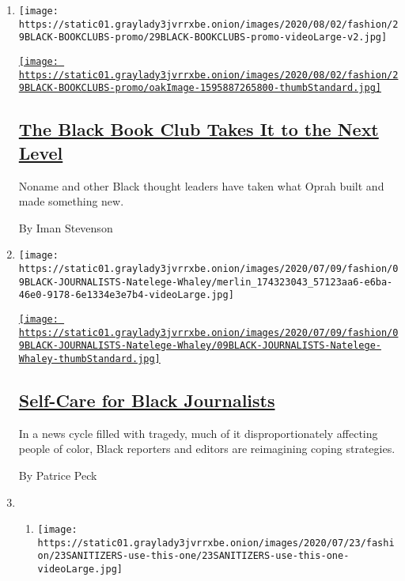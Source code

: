 \begin{enumerate}
\def\labelenumi{\arabic{enumi}.}
\item
  \texttt{[image: https://static01.graylady3jvrrxbe.onion/images/2020/08/02/fashion/29BLACK-BOOKCLUBS-promo/29BLACK-BOOKCLUBS-promo-videoLarge-v2.jpg]}

  \href{/2020/07/29/style/self-care/black-book-clubs.html}{\texttt{[image: https://static01.graylady3jvrrxbe.onion/images/2020/08/02/fashion/29BLACK-BOOKCLUBS-promo/oakImage-1595887265800-thumbStandard.jpg]}}

  \hypertarget{the-black-book-club-takes-it-to-the-next-level}{%
  \subsection{\texorpdfstring{\href{/2020/07/29/style/self-care/black-book-clubs.html}{The
  Black Book Club Takes It to the Next
  Level}}{The Black Book Club Takes It to the Next Level}}\label{the-black-book-club-takes-it-to-the-next-level}}

  Noname and other Black thought leaders have taken what Oprah built and
  made something new.

  By Iman Stevenson
\item
  \texttt{[image: https://static01.graylady3jvrrxbe.onion/images/2020/07/09/fashion/09BLACK-JOURNALISTS-Natelege-Whaley/merlin\_174323043\_57123aa6-e6ba-46e0-9178-6e1334e3e7b4-videoLarge.jpg]}

  \href{/2020/07/14/style/self-care/black-journalists.html}{\texttt{[image: https://static01.graylady3jvrrxbe.onion/images/2020/07/09/fashion/09BLACK-JOURNALISTS-Natelege-Whaley/09BLACK-JOURNALISTS-Natelege-Whaley-thumbStandard.jpg]}}

  \hypertarget{self-care-for-black-journalists}{%
  \subsection{\texorpdfstring{\href{/2020/07/14/style/self-care/black-journalists.html}{Self-Care
  for Black
  Journalists}}{Self-Care for Black Journalists}}\label{self-care-for-black-journalists}}

  In a news cycle filled with tragedy, much of it disproportionately
  affecting people of color, Black reporters and editors are reimagining
  coping strategies.

  By Patrice Peck
\item
  \begin{enumerate}
  \def\labelenumii{\arabic{enumii}.}
  \item
    \texttt{[image: https://static01.graylady3jvrrxbe.onion/images/2020/07/23/fashion/23SANITIZERS-use-this-one/23SANITIZERS-use-this-one-videoLarge.jpg]}


\end{enumerate}
\end{enumerate}
